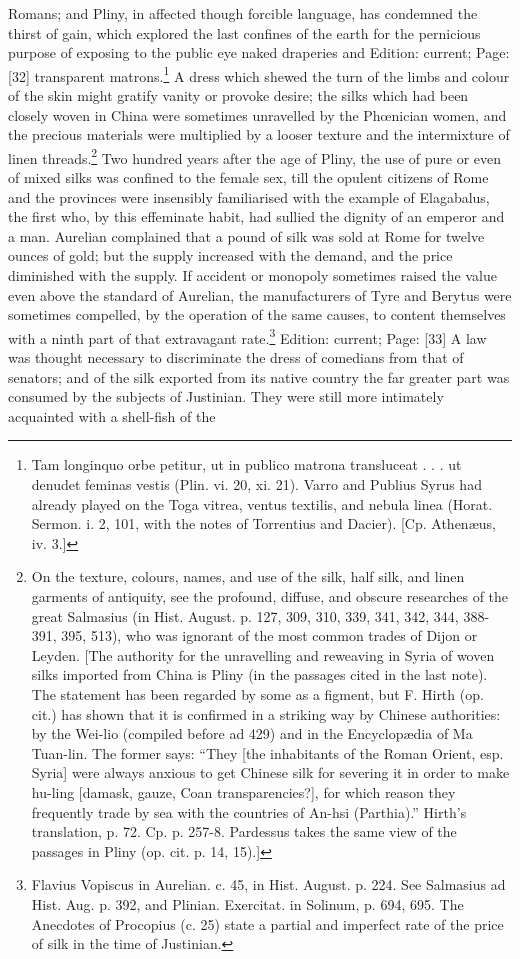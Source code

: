 Romans; and Pliny, in affected though forcible language, has condemned the thirst of gain, which explored the last confines of the earth for the pernicious purpose of exposing to the public eye naked draperies and Edition: current; Page: [32] transparent matrons.\footnote{Tam longinquo orbe petitur, ut in publico matrona transluceat . . . ut denudet feminas vestis (Plin. vi. 20, xi. 21). Varro and Publius Syrus had already played on the Toga vitrea, ventus textilis, and nebula linea (Horat. Sermon. i. 2, 101, with the notes of Torrentius and Dacier). [Cp. Athenæus, iv. 3.]} A dress which shewed the turn of the limbs and colour of the skin might gratify vanity or provoke desire; the silks which had been closely woven in China were sometimes unravelled by the Phœnician women, and the precious materials were multiplied by a looser texture and the intermixture of linen threads.\footnote{On the texture, colours, names, and use of the silk, half silk, and linen garments of antiquity, see the profound, diffuse, and obscure researches of the great Salmasius (in Hist. August. p. 127, 309, 310, 339, 341, 342, 344, 388-391, 395, 513), who was ignorant of the most common trades of Dijon or Leyden. [The authority for the unravelling and reweaving in Syria of woven silks imported from China is Pliny (in the passages cited in the last note). The statement has been regarded by some as a figment, but F. Hirth (op. cit.) has shown that it is confirmed in a striking way by Chinese authorities: by the Wei-lio (compiled before ad 429) and in the Encyclopædia of Ma Tuan-lin. The former says: \texthebrew{“}They [the inhabitants of the Roman Orient, esp. Syria] were always anxious to get Chinese silk for severing it in order to make hu-ling [damask, gauze, Coan transparencies?], for which reason they frequently trade by sea with the countries of An-hsi (Parthia).\texthebrew{}” Hirth\texthebrew{}’s translation, p. 72. Cp. p. 257-8. Pardessus takes the same view of the passages in Pliny (op. cit. p. 14, 15).]} Two hundred years after the age of Pliny, the use of pure or even of mixed silks was confined to the female sex, till the opulent citizens of Rome and the provinces were insensibly familiarised with the example of Elagabalus, the first who, by this effeminate habit, had sullied the dignity of an emperor and a man. Aurelian complained that a pound of silk was sold at Rome for twelve ounces of gold; but the supply increased with the demand, and the price diminished with the supply. If accident or monopoly sometimes raised the value even above the standard of Aurelian, the manufacturers of Tyre and Berytus were sometimes compelled, by the operation of the same causes, to content themselves with a ninth part of that extravagant rate.\footnote{Flavius Vopiscus in Aurelian. c. 45, in Hist. August. p. 224. See Salmasius ad Hist. Aug. p. 392, and Plinian. Exercitat. in Solinum, p. 694, 695. The Anecdotes of Procopius (c. 25) state a partial and imperfect rate of the price of silk in the time of Justinian.} Edition: current; Page: [33] A law was thought necessary to discriminate the dress of comedians from that of senators; and of the silk exported from its native country the far greater part was consumed by the subjects of Justinian. They were still more intimately acquainted with a shell-fish of the 